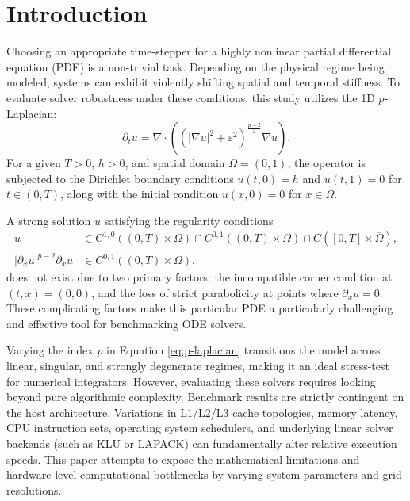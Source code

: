 \section{Introduction}
Choosing an appropriate time-stepper for a highly nonlinear partial differential equation (PDE) is a non-trivial task. Depending on the physical regime being modeled, systems can exhibit violently shifting spatial and temporal stiffness. To evaluate solver robustness under these conditions, this study utilizes the 1D \(p\)-Laplacian:
\begin{equation} \label{eq:p-laplacian}
  \partial_t u = \nabla \cdot \left( (|\nabla u|^2 + \varepsilon^2)^{\frac{p-2}{2}} \nabla u \right).
\end{equation}
For a given \(T > 0\), \(h > 0\), and spatial domain \(\Omega = (0,1)\), the operator is subjected to the Dirichlet boundary conditions \(u(t,0) = h\) and \(u(t,1) = 0\) for \(t \in (0, T)\), along with the initial condition \(u(x,0) = 0\) for \(x \in \Omega\).

A strong solution $u$ satisfying the regularity conditions
\begin{align*}
    u &\in C^{1,0}((0,T) \times \Omega) \cap C^{0,1}((0,T) \times \Omega) \cap C([0,T] \times \overline{\Omega}), \\
    |\partial_x u|^{p-2} \partial_x u &\in C^{0,1}((0,T) \times \Omega),
\end{align*}
does not exist due to two primary factors: the incompatible corner condition at $(t,x) = (0,0)$, and the loss of strict parabolicity at points where $\partial_x u = 0$. These complicating factors make this particular PDE a particularly challenging and effective tool for benchmarking ODE solvers.

Varying the index \(p\) in Equation \eqref{eq:p-laplacian} transitions the model across linear, singular, and strongly degenerate regimes, making it an ideal stress-test for numerical integrators. However, evaluating these solvers requires looking beyond pure algorithmic complexity. Benchmark results are strictly contingent on the host architecture. Variations in L1/L2/L3 cache topologies, memory latency, CPU instruction sets, operating system schedulers, and underlying linear solver backends (such as KLU or LAPACK) can fundamentally alter relative execution speeds. This paper attempts to expose the mathematical limitations and hardware-level computational bottlenecks by varying system parameters and grid resolutions.
